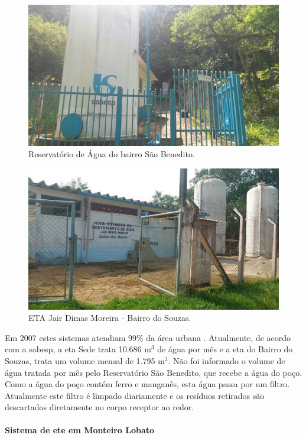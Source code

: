 	
	\begin{figure}
		\centering
		\includegraphics[width=0.75\linewidth]{produtos/prodtres/image056}
		\caption{Reservatório de Água do bairro São Benedito.}
		\label{fig:image056}
	\end{figure}
	
	
	\begin{figure}
		\centering
		\includegraphics[width=0.75\linewidth]{produtos/prodtres/image057}
		\caption{ETA Jair Dimas Moreira - Bairro do Souzas.}
		\label{fig:image057}
	\end{figure}
	
	
	Em 2007 estes sistemas atendiam 99\% da área urbana \cite{MonteiroLobato}. Atualmente, de acordo com a \gls{sabesp}, a \gls{eta} Sede trata 10.686 m$^{3}$ de água por mês e a \gls{eta} do Bairro do Souzas, trata um volume mensal de 1.795 m$^{3}$. Não foi informado o volume de água tratada por mês pelo Reservatório São Benedito, que recebe a água do poço. Como a água do poço contém ferro e manganês, esta água passa por um filtro. Atualmente este filtro é limpado diariamente e os resíduos retirados são descartados diretamente no corpo receptor ao redor.
	
	\paragraph{\textbf{Sistema de \gls{ete} em Monteiro Lobato}}
	
